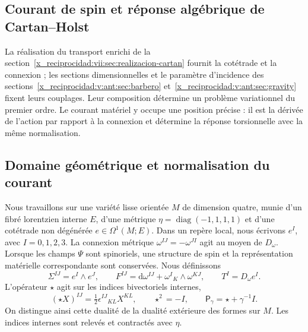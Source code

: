 \begin{HMTCompactSection}
\chapter{Courant de spin et réponse algébrique de Cartan--Holst}
\label{x_reciprocidad:vii:sec:corriente-respuesta-cartan}

La réalisation du transport enrichi de la
section~\ref{x_reciprocidad:vii:sec:realizacion-cartan} fournit la cotétrade et la
connexion ; les sections dimensionnelles et le paramètre d'incidence des
sections~\ref{x_reciprocidad:v:ant:sec:barbero} et~\ref{x_reciprocidad:v:ant:sec:gravity} fixent leurs couplages. Leur composition
détermine un problème variationnel du premier ordre. Le courant matériel
y occupe une position précise : il est la dérivée de l'action par rapport à
la connexion et détermine la réponse torsionnelle avec la même normalisation.

\section{Domaine géométrique et normalisation du courant}
\label{x_reciprocidad:vii:subsec:dominio-corriente-cartan}

Nous travaillons sur une variété lisse orientée \(M\) de dimension quatre, munie d'un fibré lorentzien interne \(E\), d'une métrique \(\eta=\operatorname{diag}(-1,1,1,1)\) et d'une cotétrade non dégénérée \(e\in\Omega^1(M;E)\). Dans un repère local, nous écrivons \(e^I\), avec \(I=0,1,2,3\). La connexion métrique \(\omega^{IJ}=-\omega^{JI}\) agit au moyen de \(D_\omega\). Lorsque les champs \(\Psi\) sont spinoriels, une structure de spin et la représentation matérielle correspondante sont conservées. Nous définissons
\begin{equation}
 \Sigma^{IJ}=e^I\wedge e^J,\qquad
 F^{IJ}=\mathrm d\omega^{IJ}+\omega^I{}_{K}\wedge\omega^{KJ},
 \qquad T^I=D_\omega e^I.
 \label{x_reciprocidad:vii:eq:campos-cartan}
\end{equation}
L'opérateur \(\star\) agit sur les indices bivectoriels internes,
\begin{equation}
 (\star X)^{IJ}=\tfrac12\epsilon^{IJ}{}_{KL}X^{KL},
 \qquad \star^2=-I,\qquad
 \mathsf P_\gamma=\star+\gamma^{-1}I.
 \label{x_reciprocidad:vii:eq:operador-holst}
\end{equation}
On distingue ainsi cette dualité de la dualité extérieure des formes sur
\(M\). Les indices internes sont relevés et contractés avec \(\eta\).


\end{HMTCompactSection}
